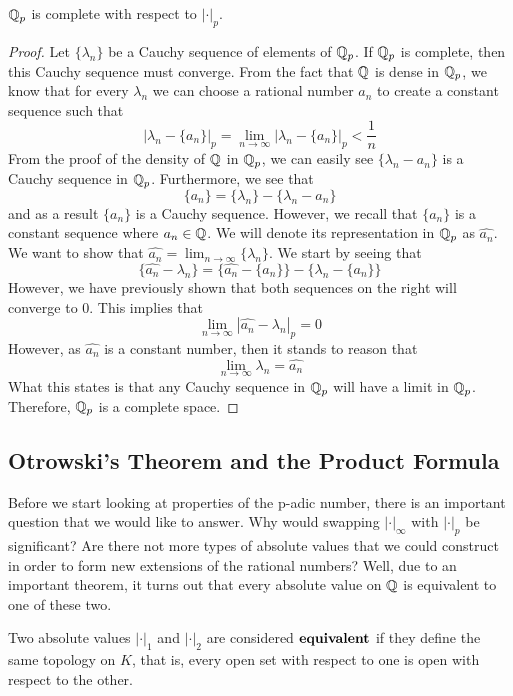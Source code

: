 \documentclass[a4paper]{article}
\begin{document}
\begin{proposition}
$\mathbb Q_p$ is complete with respect to $|\cdot|_p$.
\end{proposition}
\begin{proof}
Let $\{\lambda_n\}$ be a Cauchy sequence of elements of $\mathbb Q_p$.  If
$\mathbb Q_p$ is complete, then this Cauchy sequence must converge.
From the fact that $\mathbb Q$ is dense in $\mathbb Q_p$, we know 
that for every $\lambda_n$ we can choose a rational number $a_n$ to
create a constant sequence such that
\[
	|\lambda_n-\{a_n\}|_p=
    \lim_{n\to\infty}|\lambda_n-\{a_n\}|_p<\frac{1}{n}
\]
From the proof of the density of $\mathbb Q$ in $\mathbb Q_p$, we can easily
see $\{\lambda_n-a_n\}$ is a Cauchy sequence in $\mathbb Q_p$. Furthermore,
we see that
\[
	\{a_n\}=\{\lambda_n\}-\{\lambda_n-a_n\}
\]
and as a result $\{a_n\}$ is a Cauchy sequence.  However, we recall 
that $\{a_n\}$ is a constant sequence where $a_n\in\mathbb Q$.  We will 
denote its representation in $\mathbb Q_p$ as $\widehat{a_n}$.  We want to 
show that $\widehat{a_n}=\lim_{n\to\infty}\{\lambda_n\}$.  We start by 
seeing that
\[
	\{\widehat{a_n}-\lambda_n\}=\{\widehat{a_n}-\{a_n\}\}-
    \{\lambda_n-\{a_n\}\}
\]
However, we have previously shown that both sequences on the right will 
converge to 0.  This implies that
\[
	\lim_{n\to\infty}|\widehat{a_n}-\lambda_n|_p=0
\]
However, as $\widehat{a_n}$ is a constant number, then it stands to 
reason that 
\[
	\lim_{n\to\infty}\lambda_n=\widehat{a_n}
\]
What this states is that any Cauchy sequence in $\mathbb Q_p$ will have a 
limit in $\mathbb Q_p$.  Therefore, $\mathbb Q_p$ is a complete space.
\end{proof}

\subsection{Otrowski's Theorem and the Product Formula}

Before we start looking at properties of the p-adic number, there 
is an important question that we would like to answer.  Why would
swapping \(|\cdot|_\infty\) with \(|\cdot|_p\) be significant?  Are 
there not more types of absolute values that we could construct in 
order to form new extensions of the rational numbers?  Well, due to an
important theorem, it turns out that every absolute value on \(\mathbb Q\)
is equivalent to one of these two.

\begin{definition}
Two absolute values \(|\cdot|_1\) and \(|\cdot|_2\) are considered
\(\bf{equivalent}\) if they define the same topology on \(K\),
that is, every open set with respect to one is open with respect
to the other.
\end{definition}
\end{document}
